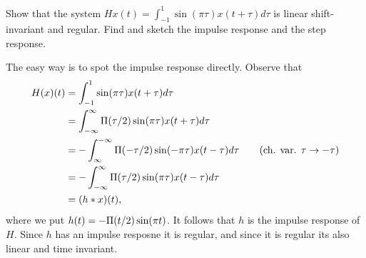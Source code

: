 \begin{excersizelist}
\begin{solution}
\begin{center}
 \;\;
\end{center}

\end{solution}


\item Show that the system $Hx(t) = \int_{-1}^{1} \sin(\pi\tau) x(t + \tau) d\tau$ is linear shift-invariant and regular.  Find and sketch the impulse response and the step response.
\begin{solution}
The easy way is to spot the impulse response directly.  Observe that
\begin{align*}
H(x)(t) &= \int_{-1}^{1} \sin(\pi\tau) x(t + \tau) d\tau \\
&= \int_{-\infty}^\infty \Pi(\tau/2) \sin(\pi\tau) x(t + \tau) d\tau\\
&= -\int_{\infty}^{-\infty} \Pi(-\tau/2) \sin(-\pi\tau) x(t - \tau) d\tau \qquad \text{(ch. var. $\tau \to -\tau$)} \\
&= -\int_{-\infty}^{\infty} \Pi(\tau/2) \sin(\pi\tau) x(t - \tau) d\tau \\
&= (h * x)(t),
\end{align*}
where we put $h(t) = -\Pi(t/2) \sin(\pi t)$.  It follows that $h$ is the impulse response of $H$.  Since $h$ has an impulse resposne it is regular, and since it is regular its also linear and time invariant.


\end{solution}
\end{excersizelist}
